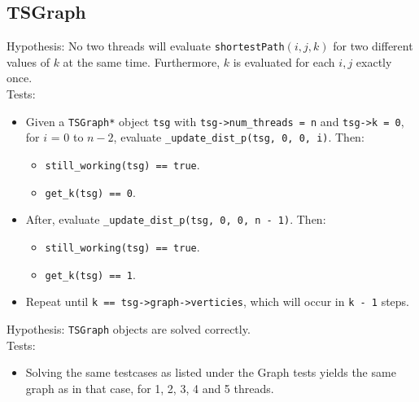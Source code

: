 \documentclass{article}
\begin{document}
\subsection{TSGraph}
Hypothesis: No two threads will evaluate \texttt{shortestPath}$(i, j,
k)$ for two different values of $k$ at the same time. Furthermore, $k$
is evaluated for each $i, j$ exactly once.\\
Tests:
\begin{itemize}
\item Given a \texttt{TSGraph*} object \texttt{tsg} with
  \texttt{tsg->num\_threads = n} and \texttt{tsg->k = 0}, for $i$ = 0 to $n - 2$, evaluate
  \texttt{\_update\_dist\_p(tsg, 0, 0, i)}. Then:
  \begin{itemize}
  \item \texttt{still\_working(tsg) == true}.
  \item \texttt{get\_k(tsg) == 0}.
  \end{itemize}
\item After, evaluate \texttt{\_update\_dist\_p(tsg, 0, 0, n - 1)}. Then:  
  \begin{itemize}
  \item \texttt{still\_working(tsg) == true}.
  \item \texttt{get\_k(tsg) == 1}.
  \end{itemize}
\item Repeat until \texttt{k == tsg->graph->verticies}, which will
  occur in \texttt{k - 1} steps.\\
\end{itemize}
Hypothesis: \texttt{TSGraph} objects are solved correctly.\\
Tests:
\begin{itemize}
\item Solving the same testcases as listed under the Graph tests
  yields the same graph as in that case, for 1, 2, 3, 4 and 5 threads.
\end{itemize}
\end{document}
